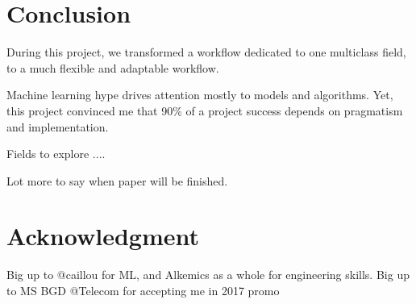 \chapter*{Conclusion} %
\label{cha:conclusion}


During this project, we transformed a workflow dedicated to one multiclass field, to a much flexible and adaptable workflow.


Machine learning hype drives attention mostly to models and algorithms. 
Yet, this project convinced me that 90\% of a project success depends on pragmatism and implementation.

Fields to explore ....

Lot more to say when paper will be finished.

\chapter*{Acknowledgment}

Big up to @caillou for ML, and Alkemics as a whole for engineering skills.
Big up to MS BGD @Telecom for accepting me in 2017 promo

